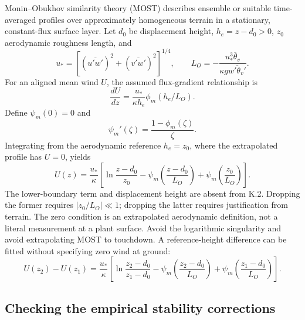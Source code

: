 Monin--Obukhov similarity theory (MOST) describes ensemble or suitable
time-averaged profiles over approximately homogeneous terrain in a
stationary, constant-flux surface layer. Let $d_0$ be displacement height,
$h_e=z-d_0>0$, $z_0$ aerodynamic roughness length, and
\begin{equation}
 u_*=[(\overline{u'w'})^2+(\overline{v'w'})^2]^{1/4},\qquad
 L_O=-\frac{u_*^3\overline\theta_v}
            {\kappa g\overline{w'\theta_v'}}.
\end{equation}
For an aligned mean wind $U$, the assumed flux-gradient relationship is
\begin{equation}
 \frac{dU}{dz}=\frac{u_*}{\kappa h_e}\phi_m(h_e/L_O).
\end{equation}
Define $\psi_m(0)=0$ and
\begin{equation}
 \psi_m'(\zeta)=\frac{1-\phi_m(\zeta)}{\zeta}.
\end{equation}
Integrating from the aerodynamic reference $h_e=z_0$, where the
extrapolated profile has $U=0$, yields
\begin{equation}
 U(z)=\frac{u_*}{\kappa}
 \left[\ln\frac{z-d_0}{z_0}-\psi_m\left(\frac{z-d_0}{L_O}\right)
                         +\psi_m\left(\frac{z_0}{L_O}\right)\right].
\end{equation}
The lower-boundary term and displacement height are absent from K.2.
Dropping the former requires $|z_0/L_O|\ll1$; dropping the latter
requires justification from terrain. The zero condition is an extrapolated
aerodynamic definition, not a literal measurement at a plant surface.
Avoid the logarithmic singularity and avoid extrapolating MOST to touchdown.
A reference-height difference can be fitted without specifying zero wind
at ground:
\begin{equation}
 U(z_2)-U(z_1)=\frac{u_*}{\kappa}
 \left[\ln\frac{z_2-d_0}{z_1-d_0}
 -\psi_m\left(\frac{z_2-d_0}{L_O}\right)
 +\psi_m\left(\frac{z_1-d_0}{L_O}\right)\right].
\end{equation}

\subsection{Checking the empirical stability corrections}

